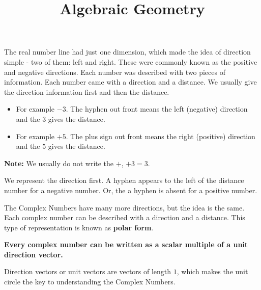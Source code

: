\documentclass{ximera}
\title{Algebraic Geometry}
\begin{document}
\begin{abstract}
\end{abstract}
\maketitle





The real number line had just one dimension, which made the idea of direction simple - two of them: left and right.  These were commonly known as the positive and negative directions.  Each number was described with two pieces of information.  Each number came with a direction and a distance.  We usually give the direction information first and then the distance.


\begin{itemize}
\item For example $-3$.  The hyphen out front means the left (negative) direction and the $3$ gives the distance.
\item For example $+5$.  The plus sign out front means the right (positive) direction and the $5$ gives the distance.
\end{itemize}
\textbf{Note:} We usually do not write the $+$, $+3 = 3$.

We represent the direction first.  A hyphen appears to the left of the distance number for a negative number. Or, the a hyphen is absent for a positive number.

The Complex Numbers have many more directions, but the idea is the same.  Each complex number can be described with a direction and a distance.  This type of representation is known as \textbf{polar form}.














\begin{center}
\textbf{\textcolor{red!70!black}{Every complex number can be written as a scalar multiple of a unit direction vector.}}
\end{center}






Direction vectors or unit vectors are vectors of length $1$, which makes the unit circle the key to understanding the Complex Numbers. \\ 
\end{document}
